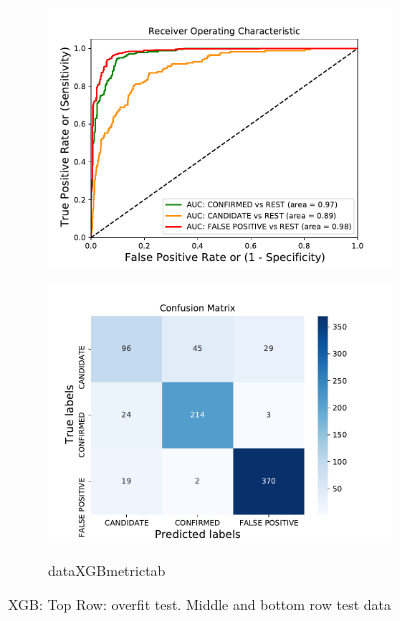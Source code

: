 \begin{figure}[H]
\begin{subfigure}{.49\textwidth}
                \includegraphics[width = 1\textwidth]{data/XGB_roc.pdf}
                \end{subfigure}
                \begin{subfigure}{.49\textwidth}
                \includegraphics[width = 1\textwidth]{data/XGB_cm.pdf}
                \end{subfigure}
                \begin{subfigure}{1\textwidth}
                \csname dataXGBmetrictab\endcsname
                \end{subfigure}
                \caption{XGB: Top Row: overfit test. Middle and bottom row test data}
                \label{fig:data/XGB_roc}
                \end{figure}
